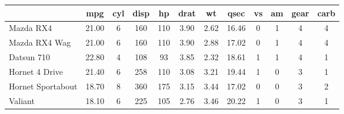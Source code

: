 \begin{tabular}{lccccccccccc}
\hline
\textbf{} & \textbf{mpg} & \textbf{cyl} & \textbf{disp} & \textbf{hp} & \textbf{drat} & \textbf{wt} & \textbf{qsec} & \textbf{vs} & \textbf{am} & \textbf{gear} & \textbf{carb} \\
\hline
Mazda RX4 & 21.00 & 6 & 160 & 110 & 3.90 & 2.62 & 16.46 & 0 & 1 & 4 & 4\\
Mazda RX4 Wag & 21.00 & 6 & 160 & 110 & 3.90 & 2.88 & 17.02 & 0 & 1 & 4 & 4\\
Datsun 710 & 22.80 & 4 & 108 & 93 & 3.85 & 2.32 & 18.61 & 1 & 1 & 4 & 1\\
Hornet 4 Drive & 21.40 & 6 & 258 & 110 & 3.08 & 3.21 & 19.44 & 1 & 0 & 3 & 1\\
Hornet Sportabout & 18.70 & 8 & 360 & 175 & 3.15 & 3.44 & 17.02 & 0 & 0 & 3 & 2\\
Valiant & 18.10 & 6 & 225 & 105 & 2.76 & 3.46 & 20.22 & 1 & 0 & 3 & 1\\
\hline
\end{tabular}
